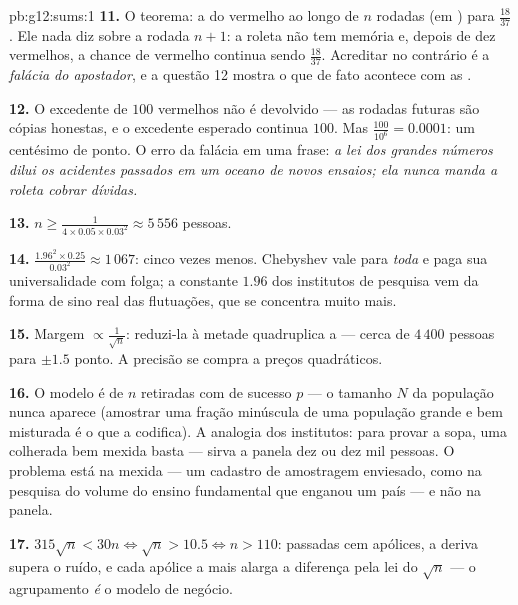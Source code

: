 \begin{solution}{pb:g12:sums:1}
\textbf{11.} O teorema: a \emph{} do vermelho ao
longo de $n$ rodadas  (em ) para
$\frac{18}{37}$. Ele nada diz sobre a rodada $n + 1$: a roleta
não tem memória e, depois de dez vermelhos, a chance de
vermelho continua sendo $\frac{18}{37}$. Acreditar no
contrário é a \emph{falácia do apostador}, e a questão 12
mostra o que de fato acontece com as .

\textbf{12.} O excedente de $100$ vermelhos não é devolvido
--- as rodadas futuras são cópias honestas, e o excedente
esperado continua $100$. Mas $\frac{100}{10^6} = 0.0001$: um
centésimo de ponto. O erro da falácia em uma frase: \emph{a
lei dos grandes números dilui os acidentes passados em um
oceano de novos ensaios; ela nunca manda a roleta cobrar
dívidas.}

\textbf{13.} $n \geq \frac{1}{4 \times 0.05 \times 0.03^2}
\approx 5\,556$ pessoas.

\textbf{14.} $\frac{1.96^2 \times 0.25}{0.03^2} \approx
1\,067$: cinco vezes menos. Chebyshev vale para \emph{toda}
 e paga sua universalidade com folga; a constante
$1.96$ dos institutos de pesquisa vem da forma de sino real
das flutuações, que se concentra muito mais.

\textbf{15.} Margem $\propto \frac{1}{\sqrt n}$: reduzi-la à
metade quadruplica a  --- cerca de $4\,400$ pessoas
para $\pm 1.5$ ponto. A precisão se compra a preços
quadráticos.

\textbf{16.} O modelo é de $n$ retiradas  com
 de sucesso $p$ --- o tamanho $N$ da população
nunca aparece (amostrar uma fração minúscula de uma população
grande e bem misturada é o que a  codifica). A
analogia dos institutos: para provar a sopa, uma colherada bem
mexida basta --- sirva a panela dez ou dez mil pessoas. O
problema está na mexida --- um cadastro de amostragem
enviesado, como na pesquisa do volume do ensino fundamental
que enganou um país --- e não na panela.

\textbf{17.} $315\sqrt n < 30n \iff \sqrt n > 10.5 \iff
n > 110$: passadas cem apólices, a deriva supera o ruído, e
cada apólice a mais alarga a diferença pela lei do $\sqrt n$
--- o agrupamento \emph{é} o modelo de negócio.


\end{solution}
